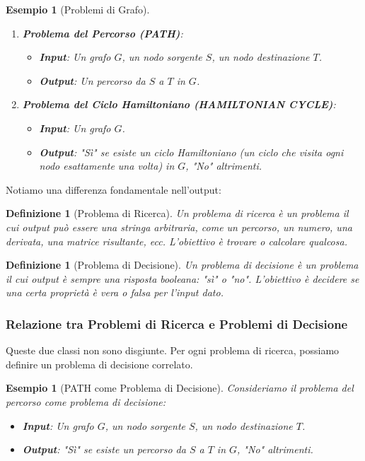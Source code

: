 \documentclass[a4paper, 11pt]{book} %
\newtheorem{definition}[theorem]{Definizione}
\newtheorem{example}[theorem]{Esempio}
\theoremstyle{definition}
\begin{document}
\begin{example}[Problemi di Grafo]
\begin{enumerate}
    \item \textbf{Problema del Percorso (PATH)}:
    \begin{itemize}
        \item \textbf{Input}: Un grafo $G$, un nodo sorgente $S$, un nodo destinazione $T$.
        \item \textbf{Output}: Un percorso da $S$ a $T$ in $G$.
    \end{itemize}
    \item \textbf{Problema del Ciclo Hamiltoniano (HAMILTONIAN CYCLE)}:
    \begin{itemize}
        \item \textbf{Input}: Un grafo $G$.
        \item \textbf{Output}: "Sì" se esiste un ciclo Hamiltoniano (un ciclo che visita ogni nodo esattamente una volta) in $G$, "No" altrimenti.
    \end{itemize}
\end{enumerate}
\end{example}

Notiamo una differenza fondamentale nell'output:

\begin{definition}[Problema di Ricerca]
Un problema di ricerca è un problema il cui output può essere una stringa arbitraria, come un percorso, un numero, una derivata, una matrice risultante, ecc. L'obiettivo è trovare o calcolare qualcosa.
\end{definition}

\begin{definition}[Problema di Decisione]
Un problema di decisione è un problema il cui output è sempre una risposta booleana: "sì" o "no". L'obiettivo è decidere se una certa proprietà è vera o falsa per l'input dato.
\end{definition}

\subsubsection{Relazione tra Problemi di Ricerca e Problemi di Decisione}
Queste due classi non sono disgiunte. Per ogni problema di ricerca, possiamo definire un problema di decisione correlato.

\begin{example}[PATH come Problema di Decisione]
Consideriamo il problema del percorso come problema di decisione:
\begin{itemize}
    \item \textbf{Input}: Un grafo $G$, un nodo sorgente $S$, un nodo destinazione $T$.
    \item \textbf{Output}: "Sì" se esiste un percorso da $S$ a $T$ in $G$, "No" altrimenti.
\end{itemize}
\end{example}
\end{document}
